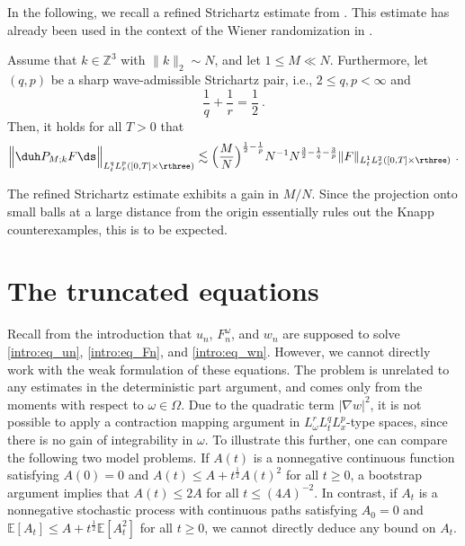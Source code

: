 \documentclass[11pt]{article}
\begin{document}
In the following, we recall a refined Strichartz estimate from \cite{KT99}. This estimate has already been used in the context of the Wiener randomization in \cite{DLM17}. 
\begin{lem}\label{prelim:lem_refined_strichartz}
Assume that \( k \in \mathbb{Z}^3 \) with \( \| k \|_2 \sim N \), and let \( 1 \leq M \ll N \). Furthermore, let \( (q,p) \) be a sharp wave-admissible Strichartz pair, i.e., \( 2 \leq q,p < \infty \) and 
\begin{equation*}
\frac{1}{q}+ \frac{1}{r} = \frac{1}{2}~. 
\end{equation*}
Then, it holds for all \( T>0 \) that
\begin{equation*}
\Big \| \duh P_{M;k} F \ds \Big \|_{L_t^q L_x^p([0,T]\times \rthree)} \lesssim \Big( \frac{M}{N} \Big)^{\frac{1}{2}-\frac{1}{p}} N^{-1} N^{\frac{3}{2}-\frac{1}{q}- \frac{3}{p}} \| F \|_{L_t^1 L_x^2([0,T]\times \rthree)}~. 
\end{equation*}
\end{lem}
The refined Strichartz estimate exhibits a gain in \( M/N \). Since the projection onto small balls at a large distance from the origin essentially rules out the Knapp counterexamples, this is to be expected. 

\section{The truncated equations}\label{sec:it} 
Recall from the introduction that \( u_n \), \( F_n^\omega \), and \( w_n \) are supposed to solve \eqref{intro:eq_un}, \eqref{intro:eq_Fn}, and \eqref{intro:eq_wn}. However, we cannot directly work with the weak formulation of these equations. The problem is unrelated to any estimates in the deterministic part argument, and comes only from the moments with respect to \( \omega \in\Omega \). Due to the quadratic term \( |\nabla w |^2 \), it is not possible to apply a contraction mapping argument in \( L_\omega^r L_t^q L_x^p \)-type spaces, since there is no gain of integrability in \( \omega \). To illustrate this further, one can compare the following two model problems. If \( A(t) \) is a nonnegative continuous function satisfying \( A(0)=0 \) and \( A(t) \leq A + t^{\frac{1}{2}} A(t)^2 \) for all \( t\geq 0 \), a bootstrap argument implies that \( A(t) \leq 2A \) for all \( t\leq (4A)^{-2} \). In contrast, if \( A_t \) is a nonnegative stochastic process with continuous paths satisfying \( A_0 = 0 \) and \( \mathbb{E}[A_t]\leq A + t^{\frac{1}{2}} \mathbb{E}[A_t^2] \) for all \( t \geq 0 \), we cannot directly deduce any bound on \( A_t\).
\end{document}
